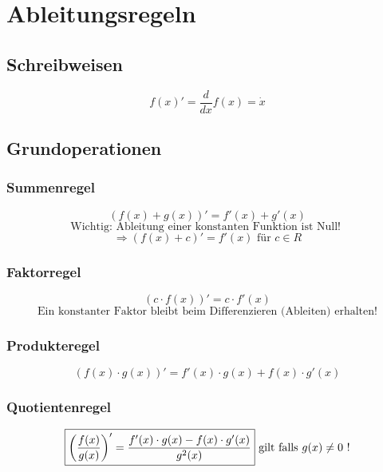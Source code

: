 \section{Ableitungsregeln}

\subsection{Schreibweisen}
\[ \boxed{f(x)' = \frac{d}{dx} f(x) = \dot{x}} \]

\subsection{Grundoperationen}

\subsubsection{Summenregel}
\[ \boxed{ (f(x) + g(x))' = f'(x) + g'(x) } \]
\[ \text{Wichtig: Ableitung einer konstanten Funktion ist Null! } \]
\[ \Rightarrow (f(x) + c)' = f'(x) \text{ für } c \in R \]

\subsubsection{Faktorregel}
\[ \boxed{ (c \cdot f(x))' = c \cdot f'(x) } \]
\[ \text{Ein konstanter Faktor bleibt beim Differenzieren (Ableiten) erhalten!} \]

\subsubsection{Produkteregel}
\[ \boxed{ (f(x) \cdot g(x))' = f'(x) \cdot g(x) + f(x) \cdot g'(x) } \]

\subsubsection{Quotientenregel}
\[ \boxed{ \left( \frac{f(x)}{g(x)} \right)' = \frac{ f'(x) \cdot g(x) - f(x) \cdot g'(x) }{ g^2(x) } } \\ \text{ gilt falls }g(x) \neq 0 \text{ !} \]

